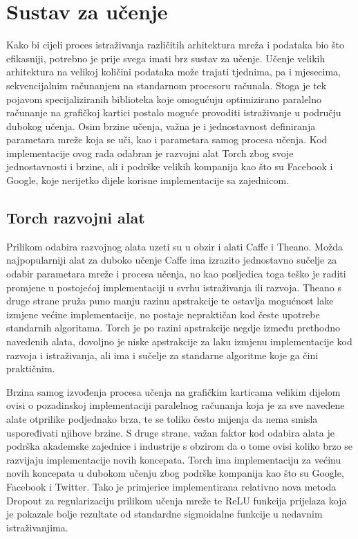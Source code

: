 \documentclass[lmodern, utf8, diplomski, numeric]{fer}
\begin{document}
\section{Sustav za učenje}

Kako bi cijeli proces istraživanja različitih arhitektura mreža i podataka bio što efikasniji, potrebno je prije svega imati brz sustav za učenje. Učenje velikih arhitektura na velikoj količini podataka može trajati tjednima, pa i mjesecima, sekvencijalnim računanjem na standarnom procesoru računala. Stoga je tek pojavom specijaliziranih biblioteka koje omogućuju optimizirano paralelno računanje na grafičkoj kartici postalo moguće provoditi istraživanje u području dubokog učenja. 
Osim brzine učenja, važna je i jednostavnost definiranja parametara mreže koja se uči, kao i parametara samog procesa učenja. Kod implementacije ovog rada odabran je razvojni alat Torch zbog svoje jednostavnosti i brzine, ali i podrške velikih kompanija kao što su Facebook i Google, koje nerijetko dijele korisne implementacije sa zajednicom. 

\subsection{Torch razvojni alat}

Prilikom odabira razvojnog alata uzeti su u obzir i alati Caffe i Theano. Možda najpopularniji alat za duboko učenje Caffe ima izrazito jednostavno sučelje za odabir parametara mreže i procesa učenja, no kao posljedica toga teško je raditi promjene u postojećoj implementaciji u svrhu istraživanja ili razvoja. Theano s druge strane pruža puno manju razinu apstrakcije te ostavlja mogućnost lake izmjene većine implementacije, no postaje nepraktičan kod česte upotrebe standarnih algoritama.
Torch je po razini apstrakcije negdje između prethodno navedenih alata, dovoljno je niske apstrakcije za laku izmjenu implementacije kod razvoja i istraživanja, ali ima i sučelje za standarne algoritme koje ga čini praktičnim. 

Brzina samog izvođenja procesa učenja na grafičkim karticama velikim dijelom ovisi o pozadinskoj implementaciji paralelnog računanja koja je za sve navedene alate otprilike podjednako brza, te se toliko često mijenja da nema smisla uspoređivati njihove brzine. S druge strane, važan faktor kod odabira alata je podrška akademske zajednice i industrije s obzirom da o tome ovisi koliko brzo se razvijaju implementacije novih koncepata. Torch ima implementaciju za većinu novih koncepata u dubokom učenju zbog podrške kompanija kao što su Google, Facebook i Twitter.  Tako je primjerice implementirana relativno nova metoda Dropout za regularizaciju prilikom učenja mreže te ReLU funkcija prijelaza koja je pokazale bolje rezultate od standardne sigmoidalne funkcije u nedavnim istraživanjima.
\end{document}
